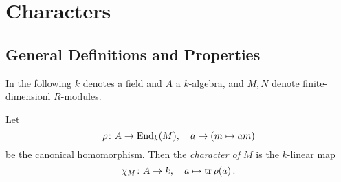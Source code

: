 \section{Characters}





\subsection{General Definitions and Properties}


\begin{conventions}
  In the following $k$ denotes a field and $A$ a $k$-algebra, and $M, N$ denote finite-dimensionl $R$-modules.
\end{conventions}


\begin{definition}
  Let
  \[
            \rho
    \colon  A
    \to     \operatorname{End}_k(M),
    \quad   a
    \mapsto (m \mapsto am)
  \]
  be the canonical homomorphism.
  Then the \emph{character of $M$} is the $k$-linear map
  \[
            \chi_M
    \colon  A
    \to     k,
    \quad   a
    \mapsto \operatorname{tr} \rho(a) \,.
  \]
\end{definition}


